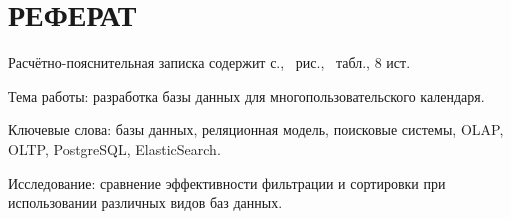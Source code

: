 \section*{РЕФЕРАТ}

Расчётно-пояснительная записка содержит \pageref{LastPage} с., \totalfigures\ рис., \totaltables\ табл., 8 ист.

Тема работы: разработка базы данных для многопользовательского календаря.

Ключевые слова: базы данных, реляционная модель, поисковые системы, OLAP, OLTP, PostgreSQL, ElasticSearch.

Исследование: сравнение эффективности фильтрации и сортировки при использовании различных видов баз данных.

\pagebreak
